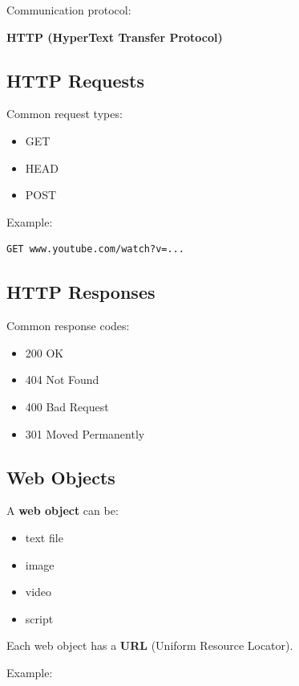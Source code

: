 Communication protocol:

\textbf{HTTP (HyperText Transfer Protocol)}

\subsection{HTTP Requests}

Common request types:

\begin{itemize}
\item GET
\item HEAD
\item POST
\end{itemize}

Example:

\begin{verbatim}
GET www.youtube.com/watch?v=...
\end{verbatim}

\subsection{HTTP Responses}

Common response codes:

\begin{itemize}
\item 200 OK
\item 404 Not Found
\item 400 Bad Request
\item 301 Moved Permanently
\end{itemize}

\subsection{Web Objects}

A \textbf{web object} can be:

\begin{itemize}
\item text file
\item image
\item video
\item script
\end{itemize}

Each web object has a \textbf{URL} (Uniform Resource Locator).

Example:

